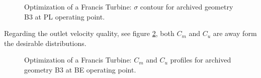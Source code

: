 \begin{figure}[h!]
\begin{minipage}[b]{1\linewidth}
 \centering
\end{minipage}
\caption{Optimization of a Francis Turbine: $\sigma$ contour for archived geometry B3 at PL operating point.}
\label{Francis-B3-PL}
\end{figure}

Regarding the outlet velocity quality, see figure \ref{Francis-B3-OUT}, both $C_m$  and $C_u$ are away form the desirable distributions.   

\begin{figure}[h!]
\begin{minipage}[b]{1\linewidth}
 \centering
\end{minipage}
\caption{Optimization of a Francis Turbine: $C_m$ and $C_u$ profiles for archived geometry B3 at BE operating point.}
\label{Francis-B3-OUT}
\end{figure}

